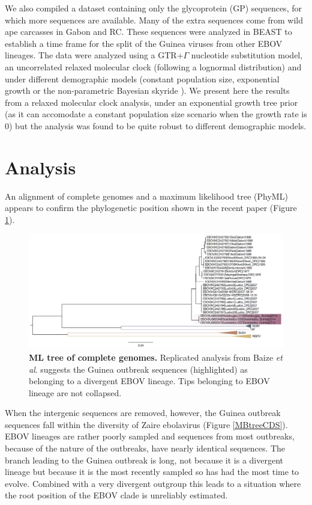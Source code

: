 \documentclass[11pt,oneside,letterpaper]{article}
\begin{document}
We also compiled a dataset containing only the glycoprotein (GP) sequences, for which more sequences are available.
Many of the extra sequences come from wild ape carcasses \cite{wittmann2007} in Gabon and RC.
These sequences were analyzed in BEAST \cite{drummond2012} to establish a time frame for the split of the Guinea viruses from other EBOV lineages.
The data were analyzed using a GTR+$\Gamma$ nucleotide substitution model,  an uncorrelated relaxed molecular clock (following a lognormal distribution) \cite{drummond2006} and under different demographic models (constant population size, exponential growth or the non-parametric Bayesian skyride \cite{minin2008}).
We present here the results from a relaxed molecular clock analysis, under an exponential growth tree prior (as it can accomodate a constant population size scenario when the growth rate is 0) but the analysis was found to be quite robust to different demographic models.

\section*{Analysis}
An alignment of complete genomes and a maximum likelihood tree (PhyML) appears to confirm the phylogenetic position shown in the recent paper \cite{baize2014} (Figure \ref{NEJMtree}).
\begin{figure}[h!]
\centering  
\includegraphics[width=1\textwidth]  {figures/ebolavirus_raw_ml_tree.png}
\caption{\textbf{ML tree of complete genomes.}
Replicated analysis from Baize \textit{et al}. \cite{baize2014} suggests the Guinea outbreak sequences (highlighted) as belonging to a divergent EBOV lineage.
Tips belonging to EBOV lineage are not collapsed.}
\label{NEJMtree}
\end{figure}

When the intergenic sequences are removed, however, the Guinea outbreak sequences fall within the diversity of Zaire ebolavirus (Figure \ref{MBtreeCDS}).
EBOV lineages are rather poorly sampled and sequences from most outbreaks, because of the nature of the outbreaks, have nearly identical sequences. 
The branch leading to the Guinea outbreak is long, not because it is a divergent lineage but because it is the most recently sampled so has had the most time to evolve.
Combined with a very divergent outgroup this leads to a situation where the root position of the EBOV clade is unreliably estimated.
\end{document}
